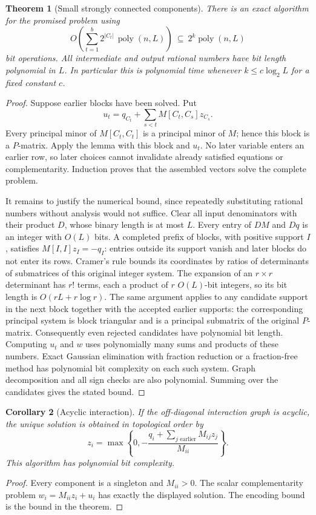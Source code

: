 \documentclass[11pt]{article}
\newtheorem{theorem}{Theorem}
\newtheorem{corollary}[theorem]{Corollary}
\theoremstyle{definition}
\begin{document}
\begin{theorem}[Small strongly connected components]
There is an exact algorithm for the promised problem using
\[
 O\!\left(\sum_{t=1}^b2^{|C_t|}\,\operatorname{poly}(n,L)\right)
 \ \subseteq\ 2^k\operatorname{poly}(n,L)
\]
bit operations. All intermediate and output rational numbers have bit length
polynomial in $L$. In particular this is polynomial time whenever
$k\leq c\log_2 L$ for a fixed constant $c$.
\end{theorem}
\begin{proof}
Suppose earlier blocks have been solved. Put
\[
 u_t=q_{C_t}+\sum_{s<t}M[C_t,C_s]z_{C_s}.
\]
Every principal minor of $M[C_t,C_t]$ is a principal minor of $M$; hence this
block is a $P$-matrix. Apply the lemma with this block and $u_t$.
No later variable enters an earlier row, so later choices cannot invalidate
already satisfied equations or complementarity. Induction proves that the
assembled vectors solve the complete problem.

It remains to justify the numerical bound, since repeatedly substituting
rational numbers without analysis would not suffice. Clear all input
denominators with their product $D$, whose binary length is at most $L$.
Every entry of $DM$ and $Dq$ is an integer with $O(L)$ bits. A completed
prefix of blocks, with positive support $I$, satisfies
$M[I,I]z_I=-q_I$: entries outside its support vanish and later blocks do
not enter its rows. Cramer's rule bounds its coordinates by ratios of
determinants of submatrices of this original integer system. The expansion
of an $r\times r$ determinant has $r!$ terms, each a product of $r$
$O(L)$-bit integers, so its bit length is $O(rL+r\log r)$.
The same argument applies to any candidate support in the next block together
with the accepted earlier supports: the corresponding principal system is
block triangular and is a principal submatrix of the original $P$-matrix.
Consequently even rejected candidates have polynomial bit length. Computing
$u_t$ and $w$ uses polynomially many sums and products of these numbers.
Exact Gaussian elimination with fraction reduction or a fraction-free method
has polynomial bit complexity on each such system. Graph decomposition and
all sign checks are also polynomial. Summing over the candidates gives the
stated bound.
\end{proof}

\begin{corollary}[Acyclic interaction]
If the off-diagonal interaction graph is acyclic, the unique solution is
obtained in topological order by
\[
 z_i=\max\left\{0,-\frac{q_i+\sum_{j\text{ earlier}}M_{ij}z_j}{M_{ii}}\right\}.
\]
This algorithm has polynomial bit complexity.
\end{corollary}
\begin{proof}
Every component is a singleton and $M_{ii}>0$. The scalar complementarity
problem $w_i=M_{ii}z_i+u_i$ has exactly the displayed solution.
The encoding bound is the bound in the theorem.
\end{proof}
\end{document}
